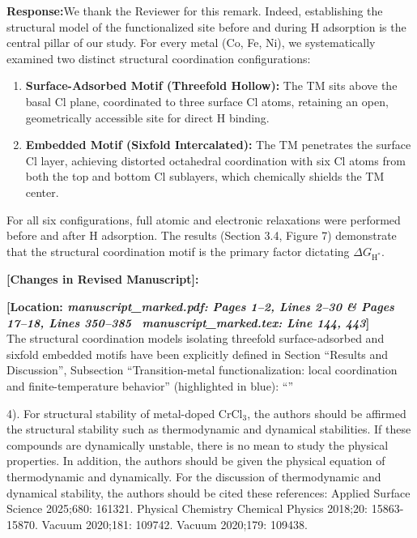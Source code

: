 \documentclass[11pt, sans, a4paper]{moderncv}
\newcommand{\response}{\vspace{0.4em}\noindent\textbf{\color{actionblue}Response:}\hspace{0.5em}}
\newcommand{\manuscriptchange}[1]{{\renewcommand{\label}[1]{}\vspace{0.4em}\noindent\textbf{\color{acsblue}[Changes in Revised Manuscript]:}\par\nopagebreak\vspace{0.15em}#1\vspace{0.4em}}}
\begin{document}
\response We thank the Reviewer for this remark. Indeed, establishing the structural model of the functionalized site before and during H adsorption is the central pillar of our study. For every metal (Co, Fe, Ni), we systematically examined two distinct structural coordination configurations:
\begin{enumerate}[leftmargin=1.5em, itemsep=0.2em]
\item \textbf{Surface-Adsorbed Motif (Threefold Hollow):} The TM sits above the basal Cl plane, coordinated to three surface Cl atoms, retaining an open, geometrically accessible site for direct H binding.
\item \textbf{Embedded Motif (Sixfold Intercalated):} The TM penetrates the surface Cl layer, achieving distorted octahedral coordination with six Cl atoms from both the top and bottom Cl sublayers, which chemically shields the TM center.
\end{enumerate}
For all six configurations, full atomic and electronic relaxations were performed before and after H adsorption. The results (Section 3.4, Figure 7) demonstrate that the structural coordination motif is the primary factor dictating $\Delta G_{\mathrm{H}^*}$.

\manuscriptchange{\textbf{[Location: \textit{manuscript\_marked.pdf: Pages 1--2, Lines 2--30 \& Pages 17--18, Lines 350--385} \textbar\ \textit{manuscript\_marked.tex: Line 144, 443}]}\\ The structural coordination models isolating threefold surface-adsorbed and sixfold embedded motifs have been explicitly defined in Section ``Results and Discussion'', Subsection ``Transition-metal functionalization: local coordination and finite-temperature behavior'' (highlighted in blue): ``{\itshape \ExecuteMetaData[manuscript_marked.tex]{HollowSiteSelection}}''}

\vspace{0.8em}

\begin{reviewercomment}
4). For structural stability of metal-doped $\text{CrCl}_3$, the authors should be affirmed the structural stability such as thermodynamic and dynamical stabilities. If these compounds are dynamically unstable, there is no mean to study the physical properties. In addition, the authors should be given the physical equation of thermodynamic and dynamically. For the discussion of thermodynamic and dynamical stability, the authors should be cited these references: Applied Surface Science 2025;680: 161321. Physical Chemistry Chemical Physics 2018;20: 15863-15870. Vacuum 2020;181: 109742. Vacuum 2020;179: 109438.
\end{reviewercomment}
\end{document}

